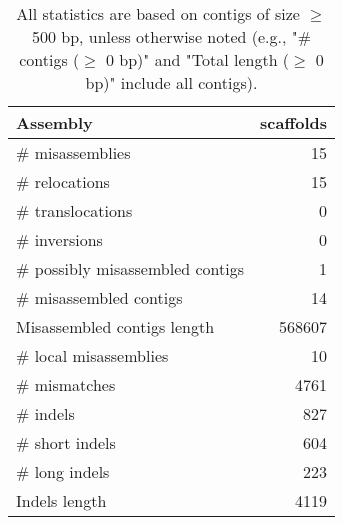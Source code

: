 \documentclass[12pt,a4paper]{article}
\begin{document}
\begin{table}[ht]
\begin{center}
\caption{All statistics are based on contigs of size $\geq$ 500 bp, unless otherwise noted (e.g., "\# contigs ($\geq$ 0 bp)" and "Total length ($\geq$ 0 bp)" include all contigs).}
\begin{tabular}{|l*{1}{|r}|}
\hline
Assembly & scaffolds \\ \hline
\# misassemblies & 15 \\ \hline
\hspace{5mm}\# relocations & 15 \\ \hline
\hspace{5mm}\# translocations & 0 \\ \hline
\hspace{5mm}\# inversions & 0 \\ \hline
\# possibly misassembled contigs & 1 \\ \hline
\# misassembled contigs & 14 \\ \hline
Misassembled contigs length & 568607 \\ \hline
\# local misassemblies & 10 \\ \hline
\# mismatches & 4761 \\ \hline
\# indels & 827 \\ \hline
\hspace{5mm}\# short indels & 604 \\ \hline
\hspace{5mm}\# long indels & 223 \\ \hline
Indels length & 4119 \\ \hline
\end{tabular}
\end{center}
\end{table}
\end{document}
